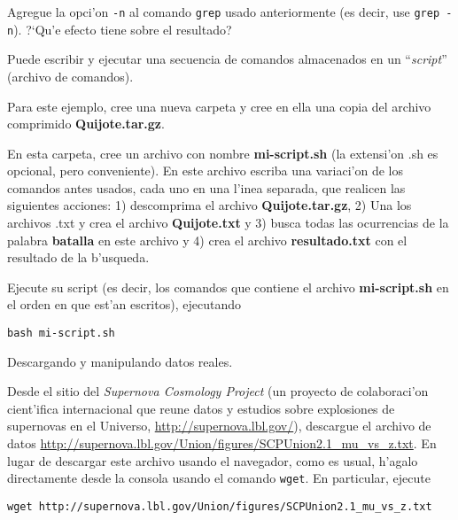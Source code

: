 \documentclass[11pt]{exam}
\begin{document}
\begin{questions}
\begin{parts}
\item Agregue la opci'on \texttt{-n} al comando \texttt{grep} usado anteriormente (es decir, use \texttt{grep -n}). ?`Qu'e efecto tiene sobre el resultado?
\end{parts}

\item Puede escribir y ejecutar una secuencia de comandos almacenados en un ``\textit{script}'' (archivo de comandos).
\begin{parts}
\item Para este ejemplo, cree una nueva carpeta y cree en ella una copia del archivo comprimido \textbf{Quijote.tar.gz}.

\item En esta carpeta, cree un archivo con nombre \textbf{mi-script.sh} (la extensi'on .sh es opcional, pero conveniente). En este archivo escriba una variaci'on de los  comandos antes usados, cada uno en una l'inea separada, que realicen las siguientes acciones: 1) descomprima el archivo \textbf{Quijote.tar.gz}, 2) Una los archivos .txt y crea el archivo \textbf{Quijote.txt} y 3) busca todas las ocurrencias de la palabra \textbf{batalla} en este archivo y 4) crea el archivo \textbf{resultado.txt} con el resultado de la b'usqueda.

\item Ejecute su script (es decir, los comandos que contiene el archivo \textbf{mi-script.sh} en el orden en que est'an escritos), ejecutando 

\begin{verbatim}
bash mi-script.sh
\end{verbatim}
\end{parts}

\item Descargando y manipulando datos reales.

\begin{parts}
\item Desde el sitio del \textit{Supernova Cosmology Project} (un proyecto de colaboraci'on cient'ifica internacional que reune datos y estudios sobre explosiones de supernovas en el Universo, \url{http://supernova.lbl.gov/}), descargue el archivo de datos  \url{http://supernova.lbl.gov/Union/figures/SCPUnion2.1_mu_vs_z.txt}. En lugar de descargar este archivo usando el navegador, como es usual, h'agalo directamente desde la consola usando el comando \texttt{wget}. En particular, ejecute 

\begin{verbatim}
wget http://supernova.lbl.gov/Union/figures/SCPUnion2.1_mu_vs_z.txt
\end{verbatim}


\end{parts}
\end{questions}
\end{document}
